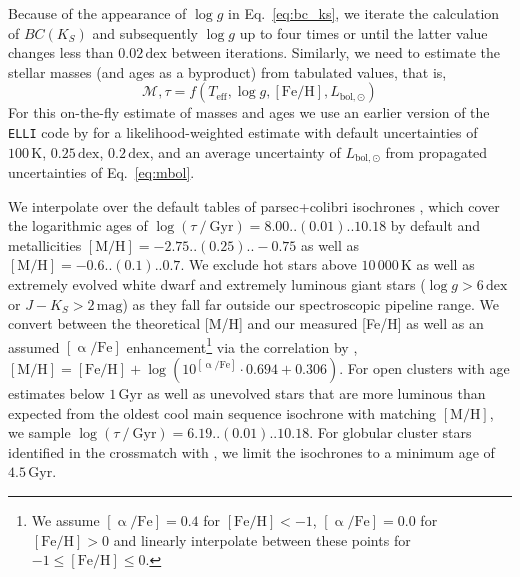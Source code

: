 \documentclass[
  journal=pasa,
  manuscript=research-paper, %
  year=2024,
  volume=37
]{cup-journal}
\begin{document}
Because of the appearance of $\log g$ in Eq.~\ref{eq:bc_ks}, we iterate the calculation of $BC(K_S)$ and subsequently $\log g$ up to four times or until the latter value changes less than $0.02\,\mathrm{dex}$ between iterations. Similarly, we need to estimate the stellar masses (and ages as a byproduct) from tabulated values, that is,
\begin{equation}
\mathcal{M}, \tau = f(T_\mathrm{eff}, \log g, \mathrm{[Fe/H]}, L_\mathrm{bol,\odot})
\label{eq:mass_age}
\end{equation}
For this on-the-fly estimate of masses and ages we use an earlier version of the \texttt{ELLI} code by \cite{Lin2018} for a likelihood-weighted estimate with default uncertainties of $100\,\mathrm{K}$, $0.25\,\mathrm{dex}$, $0.2\,\mathrm{dex}$, and an average uncertainty of $L_\mathrm{bol,\odot}$ from propagated uncertainties of Eq.~\ref{eq:mbol}.

We interpolate over the default tables of {\sc parsec+colibri} isochrones \citep{Bressan2012, Marigo2017}, which cover the logarithmic ages of $\log (\tau~/~\mathrm{Gyr}) = 8.00..(0.01)..10.18$ by default and metallicities $\mathrm{[M/H]} = -2.75..(0.25)..-0.75$ as well as $\mathrm{[M/H]} = -0.6..(0.1)..0.7$. We exclude hot stars above $10\,000\,\mathrm{K}$ as well as extremely evolved white dwarf and extremely luminous giant stars ($\log g > 6\,\mathrm{dex}$ or $J - K_S > 2\,\mathrm{mag}$) as they fall far outside our spectroscopic pipeline range. We convert between the theoretical [M/H] and our measured [Fe/H] as well as an assumed $\mathrm{[\upalpha/Fe]}$ enhancement\footnote{We assume $\mathrm{[\upalpha/Fe]} = 0.4$ for $\mathrm{[Fe/H]} < -1$, $\mathrm{[\upalpha/Fe]} = 0.0$ for $\mathrm{[Fe/H]} > 0$ and linearly interpolate between these points for $-1 \leq \mathrm{[Fe/H]} \leq 0$.} via the correlation by \citet{Salaris2006}, $\mathrm{[M/H]} = \mathrm{[Fe/H]} + \log\left(10^{\mathrm{[\upalpha/Fe]}} \cdot 0.694 + 0.306 \right)$. For open clusters with age estimates below $1\,\mathrm{Gyr}$ as well as unevolved stars that are more luminous than expected from the oldest cool main sequence isochrone with matching $\mathrm{[M/H]}$, we sample $\log (\tau~/~\mathrm{Gyr}) = 6.19..(0.01)..10.18$. For globular cluster stars identified in the crossmatch with \citet{Baumgardt2021}, we limit the isochrones to a minimum age of $4.5\,\mathrm{Gyr}$.
\end{document}
